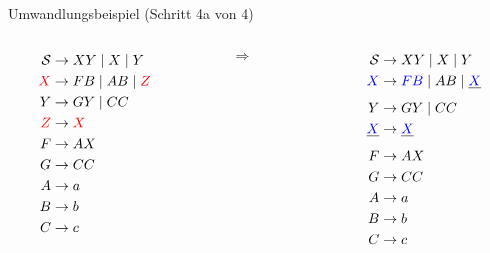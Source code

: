 \documentclass{beamer}
\begin{document}
{{\begin{exampleblock}{Umwandlungsbeispiel (Schritt 4a von 4)}
\begin{columns}[c]
\begin{column}{0.3\textwidth}
\begin{align*}
\mathcal{S} &\rightarrow XY \mid X \mid  Y\\
\textcolor{red}{X} &\rightarrow FB \mid AB \mid \textcolor{red}{Z} \\
Y &\rightarrow GY \mid CC\\
\textcolor{red}{Z} &\rightarrow \textcolor{red}{X}\\
F &\rightarrow AX\\
G &\rightarrow CC\\
A &\rightarrow a\\
B &\rightarrow b\\
C &\rightarrow c\\
\end{align*}
\end{column}
%
\
\begin{column}{0.05\textwidth}
$\Rightarrow$
\end{column}
%
\begin{column}{0.3\textwidth}
\begin{align*}
\mathcal{S} &\rightarrow XY \mid X \mid  Y\\
\textcolor{blue}{X} &\rightarrow \textcolor{blue}{FB} \mid AB \mid \sout{\textcolor{blue}{X}} \\
Y &\rightarrow GY \mid CC\\
\sout{\textcolor{blue}{X}} &\rightarrow \sout{\textcolor{blue}{X}}\\
F &\rightarrow AX\\
G &\rightarrow CC\\
A &\rightarrow a\\
B &\rightarrow b\\
C &\rightarrow c\\
\end{align*}
\end{column}
\end{columns}
\end{exampleblock}
}

}
\end{document}
